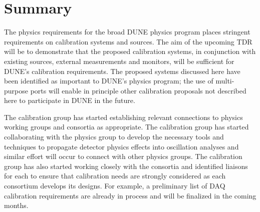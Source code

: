 \section{Summary} %
\label{sec:calibsum}

The physics requirements for the broad DUNE physics program places stringent requirements on calibration systems and sources. The aim of the upcoming TDR will be to demonstrate that the proposed calibration systems, in conjunction with existing sources, external measurements and monitors, will be sufficient for DUNE's calibration requirements. The proposed systems discussed here have been identified as important to DUNE's physics program; the use of multi-purpose ports will enable  in principle other calibration proposals not described here to participate in DUNE in the future. %

The calibration group has started establishing relevant connections to physics working groups and consortia as appropriate. The calibration group has started collaborating with the \lbl physics group to develop the necessary tools and techniques to propagate detector physics effects into oscillation analyses and similar effort will occur to connect with other physics groups. The calibration group has also started working closely with the consortia and identified liaisons for each 
to ensure that calibration needs are strongly considered as each consortium develops its designs. For example, a preliminary list of DAQ calibration requirements are already in process and  will be finalized in the coming months.






